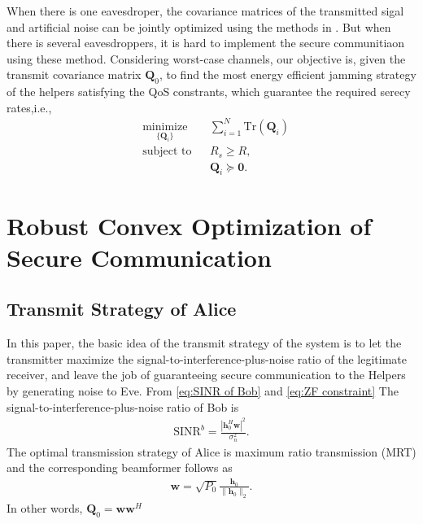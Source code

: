 \documentclass[journal]{IEEEtran}
\begin{document}
When there is one eavesdroper, the covariance matrices of the transmitted sigal and artificial noise can be jointly optimized using the methods in \cite{huang_robust_2012,Zhang_Cooperative2015}. But when there is several eavesdroppers, it is hard to implement the secure communitiaon using these method. Considering worst-case channels, our objective is, given the transmit covariance matrix $\mathbf{Q}_0$, to find the most energy efficient jamming strategy of the helpers satisfying the QoS constrants, which guarantee the required serecy rates,i.e.,
\begin{equation}
\begin{aligned} \label{eq:objective}
& \underset{\{\mathbf{Q}_i\}}{\text{minimize}}
& & \sum_{i = 1}^{N}\text{Tr}\left(\mathbf{Q}_i\right)\\
& \text{subject to}
& &    R_s \geq R,\\
& & & \mathbf{Q}_i \succeq \mathbf{0}.
\end{aligned}
\end{equation}


\section{Robust Convex Optimization of Secure Communication} \label{sec:robust programming}


\subsection{Transmit Strategy of Alice}
In this paper, the basic idea of the transmit strategy of the system is to let the transmitter maximize the signal-to-interference-plus-noise ratio of the legitimate receiver, and leave the job of guaranteeing secure communication to the Helpers by generating noise to Eve. From \eqref{eq:SINR of Bob} and \eqref{eq:ZF constraint} The signal-to-interference-plus-noise ratio of Bob is 
\begin{eqnarray}
\mathrm{SINR}^b= \frac{\left| \mathbf{h}_{0}^H\mathbf{w}\right|^2}{\sigma_n^2 }. 
\end{eqnarray}
The optimal transmission strategy of Alice is maximum ratio transmission (MRT) and the corresponding beamformer follows as
\begin{eqnarray}
\mathbf{w} = \sqrt{P_0}\frac{\mathbf{h}_0}{\|\mathbf{h}_0\|_2} \label{eq:optimal_w}.
\end{eqnarray}
In other words, $\mathbf{Q}_0 = \mathbf{w}\mathbf{w}^H$
\end{document}
